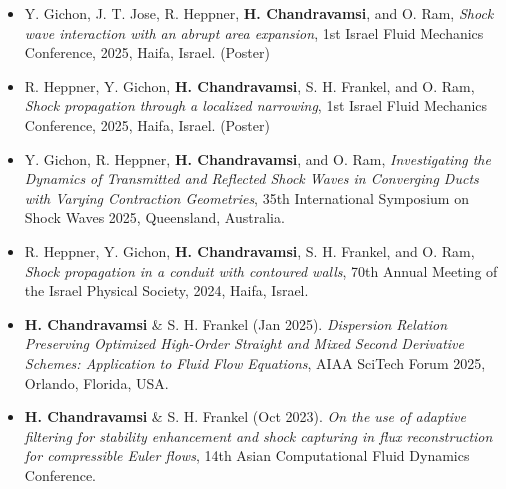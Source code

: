\begin{itemize}[itemsep=0pt, topsep=5pt, label=]
    \item Y. Gichon, J. T. Jose, R. Heppner, \textbf{H. Chandravamsi}, and O. Ram, \textit{Shock wave interaction with an abrupt area expansion}, 1st Israel Fluid Mechanics Conference, 2025, Haifa, Israel. (Poster)
\end{itemize}

\begin{itemize}[itemsep=0pt, topsep=5pt, label=]
    \item R. Heppner, Y. Gichon, \textbf{H. Chandravamsi}, S. H. Frankel, and O. Ram, \textit{Shock propagation through a localized narrowing}, 1st Israel Fluid Mechanics Conference, 2025, Haifa, Israel. (Poster) 
\end{itemize}

\begin{itemize}[itemsep=0pt, topsep=5pt, label=]
    \item Y. Gichon, R. Heppner, \textbf{H. Chandravamsi}, and O. Ram, \textit{Investigating the Dynamics of Transmitted and Reflected Shock Waves in Converging Ducts with Varying Contraction Geometries}, 35th International Symposium on Shock Waves 2025, Queensland, Australia. 
\end{itemize}

\begin{itemize}[itemsep=0pt, topsep=5pt, label=]
    \item R. Heppner, Y. Gichon, \textbf{H. Chandravamsi}, S. H. Frankel, and O. Ram, \textit{Shock propagation in a conduit with contoured walls}, 70th Annual Meeting of the Israel Physical Society, 2024, Haifa, Israel. 
\end{itemize}

\begin{itemize}[itemsep=0pt, topsep=5pt, label=]
    \item \textbf{H. Chandravamsi} \& S. H. Frankel (Jan 2025). \textit{Dispersion Relation Preserving Optimized High-Order Straight and Mixed Second Derivative Schemes: Application to Fluid Flow Equations}, AIAA SciTech Forum 2025, Orlando, Florida, USA.
\end{itemize}

\begin{itemize}[itemsep=0pt, topsep=0pt, label=]
    \item \textbf{H. Chandravamsi} \& S. H. Frankel (Oct 2023). \textit{On the use of adaptive filtering for stability enhancement and shock capturing in flux reconstruction for compressible Euler flows}, 14th Asian Computational Fluid Dynamics Conference.
\end{itemize}

